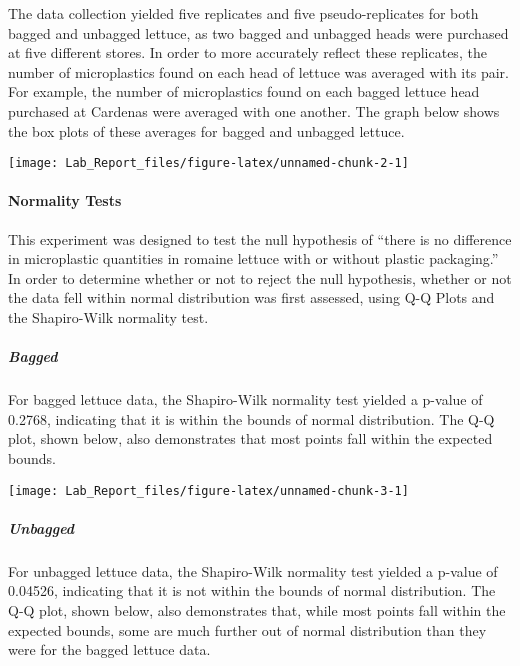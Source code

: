 \documentclass[]{article}
\let\oldparagraph\paragraph
\renewcommand{\paragraph}[1]{\oldparagraph{#1}\mbox{}}
\let\oldsubparagraph\subparagraph
\renewcommand{\subparagraph}[1]{\oldsubparagraph{#1}\mbox{}}
\begin{document}
The data collection yielded five replicates and five pseudo-replicates
for both bagged and unbagged lettuce, as two bagged and unbagged heads
were purchased at five different stores. In order to more accurately
reflect these replicates, the number of microplastics found on each head
of lettuce was averaged with its pair. For example, the number of
microplastics found on each bagged lettuce head purchased at Cardenas
were averaged with one another. The graph below shows the box plots of
these averages for bagged and unbagged lettuce.

\begin{center}\texttt{[image: Lab\_Report\_files/figure-latex/unnamed-chunk-2-1]} \end{center}

\hypertarget{normality-tests}{%
\paragraph{\texorpdfstring{Normality Tests\\
}{Normality Tests }}\label{normality-tests}}

This experiment was designed to test the null hypothesis of ``there is
no difference in microplastic quantities in romaine lettuce with or
without plastic packaging.'' In order to determine whether or not to
reject the null hypothesis, whether or not the data fell within normal
distribution was first assessed, using Q-Q Plots and the Shapiro-Wilk
normality test.

\hypertarget{bagged}{%
\subparagraph{Bagged}\label{bagged}}

For bagged lettuce data, the Shapiro-Wilk normality test yielded a
p-value of 0.2768, indicating that it is within the bounds of normal
distribution. The Q-Q plot, shown below, also demonstrates that most
points fall within the expected bounds.

\begin{center}\texttt{[image: Lab\_Report\_files/figure-latex/unnamed-chunk-3-1]} \end{center}

\hypertarget{unbagged}{%
\subparagraph{Unbagged}\label{unbagged}}

For unbagged lettuce data, the Shapiro-Wilk normality test yielded a
p-value of 0.04526, indicating that it is not within the bounds of
normal distribution. The Q-Q plot, shown below, also demonstrates that,
while most points fall within the expected bounds, some are much further
out of normal distribution than they were for the bagged lettuce data.
\end{document}
